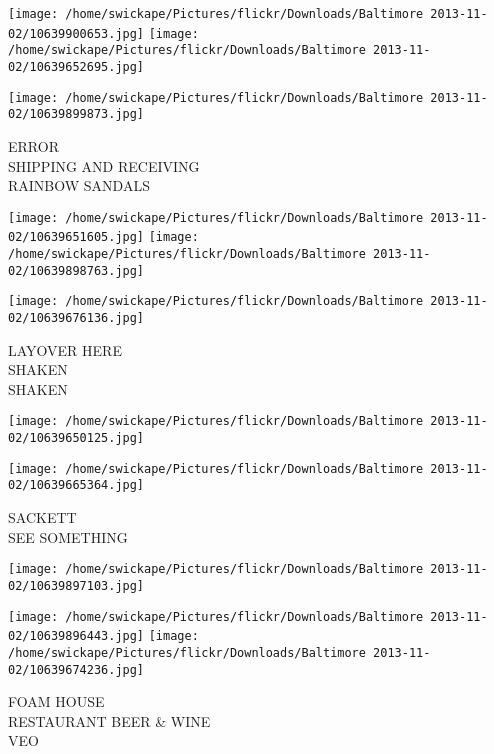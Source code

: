 \documentclass[10pt,letterpaper]{article}
\begin{document}
\texttt{[image: /home/swickape/Pictures/flickr/Downloads/Baltimore 2013-11-02/10639900653.jpg]}
\texttt{[image: /home/swickape/Pictures/flickr/Downloads/Baltimore 2013-11-02/10639652695.jpg]}

\vspace{0.25in}
\texttt{[image: /home/swickape/Pictures/flickr/Downloads/Baltimore 2013-11-02/10639899873.jpg]}

ERROR\\
SHIPPING AND RECEIVING\\
RAINBOW SANDALS\\
\pagebreak

\texttt{[image: /home/swickape/Pictures/flickr/Downloads/Baltimore 2013-11-02/10639651605.jpg]}
\texttt{[image: /home/swickape/Pictures/flickr/Downloads/Baltimore 2013-11-02/10639898763.jpg]}

\vspace{0.25in}
\texttt{[image: /home/swickape/Pictures/flickr/Downloads/Baltimore 2013-11-02/10639676136.jpg]}

LAYOVER HERE\\
SHAKEN\\
SHAKEN\\
\pagebreak

\texttt{[image: /home/swickape/Pictures/flickr/Downloads/Baltimore 2013-11-02/10639650125.jpg]}

\vspace{0.25in}
\texttt{[image: /home/swickape/Pictures/flickr/Downloads/Baltimore 2013-11-02/10639665364.jpg]}

SACKETT\\
SEE SOMETHING\\
\pagebreak

\texttt{[image: /home/swickape/Pictures/flickr/Downloads/Baltimore 2013-11-02/10639897103.jpg]}

\vspace{0.25in}
\texttt{[image: /home/swickape/Pictures/flickr/Downloads/Baltimore 2013-11-02/10639896443.jpg]}
\texttt{[image: /home/swickape/Pictures/flickr/Downloads/Baltimore 2013-11-02/10639674236.jpg]}

FOAM HOUSE\\
RESTAURANT BEER \& WINE\\
VEO\\
\pagebreak
\end{document}
